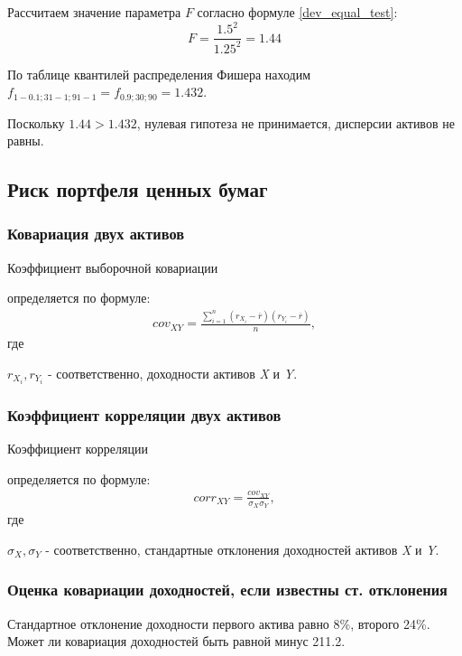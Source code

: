 \documentclass[12pt, table, a4paper,twoside]{exam}
\begin{document}
\begin{questions}
\begin{solution}[4em]
	\raggedright
	Рассчитаем значение параметра $F$ согласно формуле \eqref{dev_equal_test}:
	$$F=\frac{1.5^2}{1.25^2}=1.44$$
	
	По таблице квантилей распределения Фишера находим $f_{1-0.1;31-1;91-1}=f_{0.9;30;90}=1.432$. 
	
	Поскольку $1.44>1.432$, нулевая гипотеза не принимается, дисперсии активов не равны.
\end{solution}


\vfill\null\pagebreak
\subsection{Риск портфеля ценных бумаг}

\subsubsection{Ковариация двух активов}
\question[10] Коэффициент выборочной ковариации 

\begin{solution}[12em]
	\raggedright
	определяется по формуле:
	\begin{align}
	\label{covxy}
	cov_{XY}=\frac{\sum_{i=1}^n \left(r_{X_i}-\overline{r} \right)\left(r_{Y_i}-\overline{r} \right)}{n},
	\end{align}
	где 
	
	$r_{X_i}, r_{Y_i}$ - соответственно, доходности активов \textit{X} и \textit{Y}.
\end{solution}


\subsubsection{Коэффициент корреляции двух активов}
\question[10] Коэффициент корреляции

\begin{solution}[12em]
	
\raggedright
определяется по формуле:
\begin{align}
\label{corrxy}
corr_{XY}=\frac{cov_{XY}}{\sigma_X \sigma_Y},
\end{align}
где 

$\sigma_X, \sigma_Y$ - соответственно, стандартные отклонения доходностей активов \textit{X} и \textit{Y}. 
\end{solution}

\subsubsection{Оценка ковариации доходностей, если известны ст. отклонения}
\question[10] Стандартное отклонение доходности первого актива равно 8\%, второго 24\%. Может ли ковариация доходностей быть равной минус 211.2. 


\end{questions}
\end{document}
